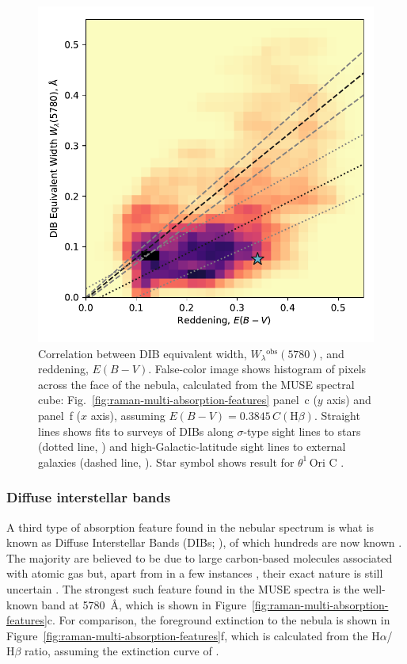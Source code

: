 \documentclass[useAMS, usenatbib, a4paper]{mnras}
\def\th#1#2{\ensuremath{\theta^{#1}\,\text{Ori~#2}}}
\newcommand\ha{\ensuremath{\text{H}\alpha}}
\newcommand\hb{\ensuremath{\text{H}\beta}}
\newcommand\observed{\ensuremath{^{\text{obs}}}}
\begin{document}
\begin{figure}
  \centering
  \includegraphics[width=\linewidth]{figs/correlation-DIB-reddening}
  \caption{
    Correlation between DIB equivalent width,
    \(W_\lambda\observed(5780)\), and reddening, \(E(B - V)\).
    False-color image shows histogram of pixels across the face of the nebula,
    calculated from the MUSE spectral cube: 
    Fig.~\ref{fig:raman-multi-absorption-features} panel~c (\(y\) axis)
    and panel~f (\(x\) axis), assuming \(E(B - V) = 0.3845\, C(\hb)\).
    Straight lines shows fits to surveys of DIBs along \(\sigma\)-type sight lines
    to stars (dotted line, \citealp{Kos:2013a})
    and high-Galactic-latitude sight lines to external galaxies
    (dashed line, \citealp{Baron:2015a}).
    Star symbol shows result for \th1C \citep{Friedman:2011a}.
  }
  \label{fig:dib-redden}
\end{figure}


\subsubsection{Diffuse interstellar bands}
\label{sec:solid-state-absorpt}

A third type of absorption feature found in the nebular spectrum
is what is known as Diffuse Interstellar Bands (DIBs; \citealp{Heger:1922a}),
of which hundreds are now known \citep{Galazutdinov:2000a, Hobbs:2008a}.
The majority are believed to be due to large carbon-based molecules
associated with atomic gas \citep{Sonnentrucker:2014a}
but, apart from in a few instances \citep{Cordiner:2019a},
their exact nature is still uncertain \citep{Tielens:2014a, Omont:2019a, Lai:2020a}.
The strongest such feature found in the MUSE spectra is the well-known band
at \SI{5780}{\angstrom}, which is shown in Figure~\ref{fig:raman-multi-absorption-features}c.
For comparison, the foreground extinction to the nebula is shown in
Figure~\ref{fig:raman-multi-absorption-features}f,
which is calculated from the \ha{}/\hb{} ratio,
assuming the extinction curve of \citet{Blagrave:2007a}.
\end{document}
